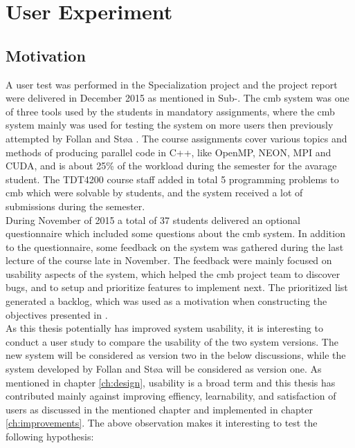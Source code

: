 \section{User Experiment}
\label{sec:user-testing}

\subsection{Motivation}
A user test was performed in the Specialization project and the project report were delivered in December 2015 as mentioned in Sub-. The \gls{cmb} system was one of three tools used by the students in mandatory assignments, where the \gls{cmb} system mainly was used for testing the system on more users then previously attempted by Follan and Støa \cite{mt:T&S}. The course assignments cover various topics and methods of producing parallel code in C++, like OpenMP, NEON, MPI and CUDA, and is about 25\% of the workload during the semester for the avarage student. The TDT4200 course staff added in total 5 programming problems to \gls{cmb} which were solvable by students, and the system received a lot of submissions during the semester. \\

During November of 2015 a total of 37 students delivered an optional questionnaire which included some questions about the \gls{cmb} system. In addition to the questionnaire, some feedback on the system was gathered during the last lecture of the course late in November. The feedback were mainly focused on usability aspects of the system, which helped the \gls{cmb} project team to discover bugs, and to setup and prioritize features to implement next. The prioritized list generated a backlog, which was used as a motivation when constructing the objectives presented in . \\

As this thesis potentially has improved system usability, it is interesting to conduct a user study to compare the usability of the two system versions. The new system will be considered as version two in the below discussions, while the system developed by Follan and Støa will be considered as version one. As mentioned in chapter \ref{ch:design}, usability is a broad term and this thesis has contributed mainly against improving effiency, learnability, and satisfaction of users as discussed in the mentioned chapter and implemented in chapter \ref{ch:improvements}. The above observation makes it interesting to test the following hypothesis:

